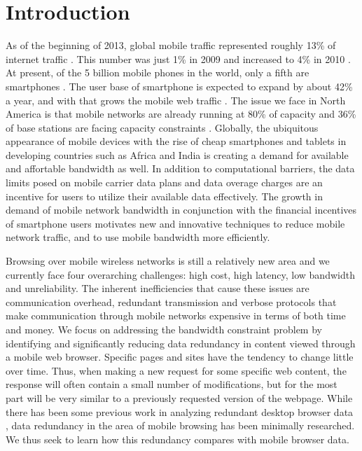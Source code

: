 \section{Introduction}
As of the beginning of 2013, global mobile traffic represented roughly 13\% of internet traffic \cite{?}. This number was just 1\% in 2009 and increased to 4\% in 2010 \cite{?}. At present, of the 5 billion mobile phones in the world, only a fifth are smartphones \cite{?}. The user base of smartphone is expected to expand by about 42\% a year, and with that grows the mobile web traffic \cite{?}. The issue we face in North America is that mobile networks are already running at 80\% of capacity and 36\% of base stations are facing capacity constraints \cite{?}. Globally, the ubiquitous appearance of mobile devices with the rise of cheap smartphones and tablets in developing countries such as Africa and India is creating a demand for available and affortable bandwidth as well. In addition to computational barriers, the data limits posed on mobile carrier data plans and data overage charges are an incentive for users to utilize their available data effectively. The growth in demand of mobile network bandwidth in conjunction with the financial incentives of smartphone users motivates new and innovative techniques to reduce mobile network traffic, and to use mobile bandwidth more efficiently. 

Browsing over mobile wireless networks is still a relatively new area and we currently face four overarching challenges: high cost, high latency, low bandwidth and unreliability. The inherent inefficiencies that cause these issues are communication overhead, redundant transmission and %
verbose protocols that make communication through mobile networks expensive in terms of both time and money. 
We focus on addressing the bandwidth constraint problem by identifying and significantly reducing data redundancy in content viewed through a mobile web browser. Specific pages and sites have the tendency to change little over time. Thus, when making a new request for some specific web content, the response will often contain a small number of modifications, but for the most part will be very similar to a previously requested version of the webpage. While there has been some previous work in analyzing redundant desktop browser data \cite{?}, data redundancy in the area of mobile browsing has been minimally researched. We thus seek to learn how this redundancy compares with mobile browser data. %

